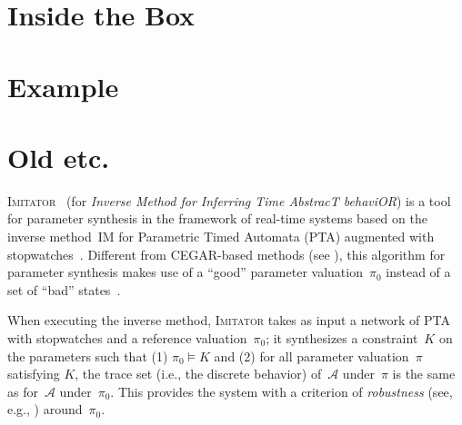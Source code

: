 \documentclass[a4paper,11pt]{article}
\newcommand{\A}{\mathcal{A}}
\newcommand{\Ko}{K}
\newcommand{\pio}{\pi_0}
\newcommand{\piprime}{\pi}
\newcommand{\IM}{\mathrm{IM}}
\newcommand{\hytech}{{\sc HyTech}}
\newcommand{\imitator}{\textsc{Imitator}}
\begin{document}
\section{Inside the Box}



\section{Example}




\section{Old etc.}


\imitator{}~\cite{AFKS12} (for \emph{Inverse Method for Inferring Time AbstracT behaviOR}) is a tool for parameter synthesis in the framework of real-time systems based on the inverse method~$\IM$ for Parametric Timed Automata (PTA) augmented with stopwatches~\cite{AHV93,AM02}.
Different from CEGAR-based methods (see \cite{cgjlv00}), this algorithm for parameter synthesis makes use of a ``good'' parameter valuation~$\pio$ instead of a set of ``bad'' states~\cite{AS13}.

When executing the inverse method, \imitator{} takes as input a network of PTA with stopwatches
and a reference valuation~$\pio$; it synthesizes a constraint~$\Ko$ on the parameters such that (1) $\pio \models \Ko$ and (2) for all parameter valuation~$\piprime$ satisfying $\Ko$, the trace set (i.e., the discrete behavior) of~$\A$ under~$\piprime$ is the same as for~$\A$ under~$\pio$.
This provides the system with a criterion of \emph{robustness} (see, e.g., \cite{Markey11})
around~$\pio$.

\end{document}
